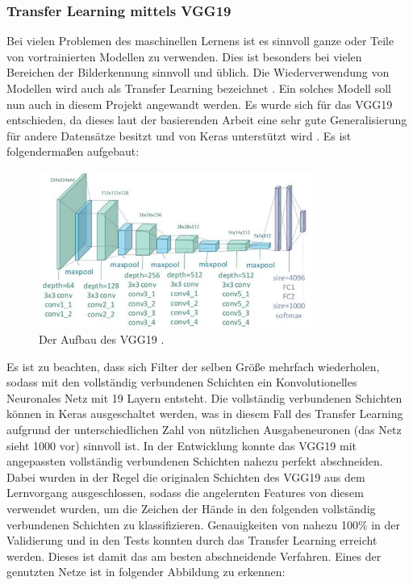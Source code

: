 \documentclass[11pt,bibliography=totocnumbered]{scrartcl}
\begin{document}
\subsubsection{Transfer Learning mittels VGG19}
Bei vielen Problemen des maschinellen Lernens ist es sinnvoll ganze oder Teile von vortrainierten Modellen zu verwenden. Dies ist besonders bei vielen Bereichen der Bilderkennung sinnvoll und üblich. Die Wiederverwendung von Modellen wird auch als Transfer Learning bezeichnet \cite[S.287]{MACHINE_LEARNING}. Ein solches Modell soll nun auch in diesem Projekt angewandt werden. Es wurde sich für das VGG19 entschieden, da dieses laut der basierenden Arbeit eine sehr gute Generalisierung für andere Datensätze besitzt und von Keras unterstützt wird \cite{VGG19}. Es ist folgendermaßen aufgebaut:
\begin{figure}[H]
	\centering
	\includegraphics[width=0.80\textwidth]{vgg_19_img}
	\vspace*{-3mm}
	\caption[Aufbau des VGG19]{Der Aufbau des VGG19 \cite{VGG_19_IMG}.}
	\label{fig:vgg_19}
\end{figure}
\vspace*{-5mm}
Es ist zu beachten, dass sich Filter der selben Größe mehrfach wiederholen, sodass mit den vollständig verbundenen Schichten ein Konvolutionelles Neuronales Netz mit 19 Layern entsteht. Die vollständig verbundenen Schichten können in Keras ausgeschaltet werden, was in diesem Fall des Transfer Learning aufgrund der unterschiedlichen Zahl von nützlichen Ausgabeneuronen (das Netz sieht 1000 vor) sinnvoll ist. In der Entwicklung konnte das VGG19 mit angepassten vollständig verbundenen Schichten nahezu perfekt abschneiden. Dabei wurden in der Regel die originalen Schichten des VGG19 aus dem Lernvorgang ausgeschlossen, sodass die angelernten Features von diesem verwendet wurden, um die Zeichen der Hände in den folgenden vollständig verbundenen Schichten zu klassifizieren. Genauigkeiten von nahezu 100\% in der Validierung und in den Tests konnten durch das Transfer Learning erreicht werden. Dieses ist damit das am besten abschneidende Verfahren. Eines der genutzten Netze ist in folgender Abbildung zu erkennen:
\end{document}
